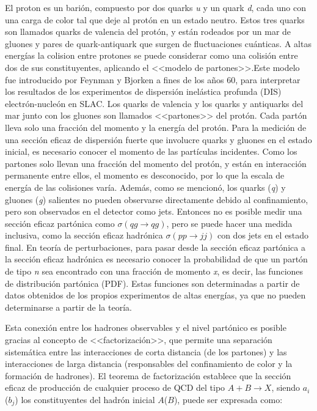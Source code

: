 El proton es un barión, compuesto por dos quarks \textit{u} y un quark \textit{d}, cada uno con una carga de color tal que deje al protón en un estado neutro. Estos tres quarks son llamados quarks de valencia del protón, y están rodeados por un mar de gluones y pares de quark-antiquark que surgen de fluctuaciones cuánticas. A altas energías la colision entre protones se puede considerar como una colisión entre dos de sus constituyentes, aplicando el <<modelo de partones>>.Este modelo fue introducido por Feynman \cite{PhysRevLett.23.1415} y Bjorken \cite{PhysRev.185.1975} a fines de los años 60, para interpretar los resultados de los experimentos de dispersión inelástica profunda (DIS) electrón-nucleón en SLAC. Los quarks de valencia y los quarks y antiquarks del mar junto con los gluones son llamados <<partones>> del protón. Cada partón lleva solo una fracción del momento y la energía del protón. Para la medición de una sección eficaz de dispersión fuerte que involucre quarks y gluones en el estado inicial, es necesario conocer el momento de las partículas incidentes. Como los partones solo llevan una fracción del momento del protón, y están en interacción permanente entre ellos, el momento es desconocido, por lo que la escala de energía de las colisiones varía. Además, como se mencionó, los quarks (\textit{q}) y gluones (\textit{g}) salientes no pueden observarse directamente debido al confinamiento, pero son observados en el detector como jets. Entonces no es posible medir una sección eficaz partónica como $\sigma(qg \rightarrow qg)$, pero se puede hacer una medida inclusiva, como la sección eficaz hadrónica $\sigma(pp \rightarrow jj)$ con dos jets en el estado final. En teoría de perturbaciones, para pasar desde la sección eficaz partónica a la sección eficaz hadrónica es necesario conocer la probabilidad de que un partón de tipo \textit{n} sea encontrado con una fracción de momento \textit{x}, es decir, las funciones de distribución partónica (PDF). Estas funciones son determinadas a partir de datos obtenidos de los propios experimentos de altas energías, ya que no pueden determinarse a partir de la teoría. 

Esta conexión entre los hadrones observables y el nivel partónico es posible gracias al concepto de <<factorización>>, que permite una separación sistemática entre las interacciones de corta distancia (de los partones) y las interacciones de larga distancia (responsables del confinamiento de color y la formación de hadrones). El teorema de factorización \cite{ELLIS1978281} establece que la sección eficaz de producción de cualquier proceso de QCD del tipo $A + B \rightarrow X$, siendo $a_{i}$ ($b_{j}$) los constituyentes del hadrón inicial $A$($B$), puede ser expresada como: 

